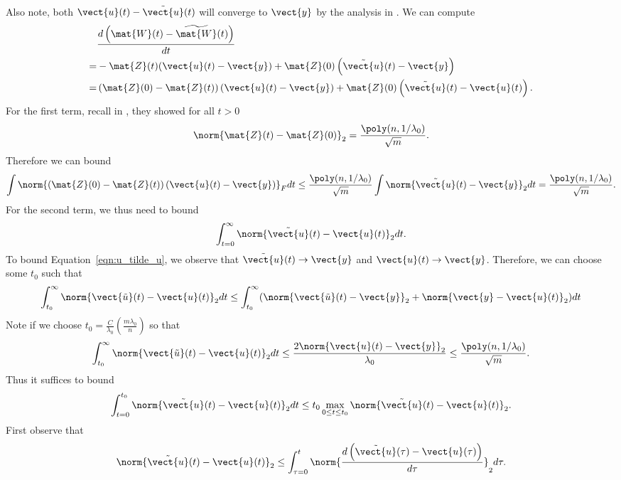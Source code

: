Also note, both $\vect{u}(t)-\tilde{\vect{u}}(t)$ will converge to $\vect{y}$ by the analysis in \cite{du2018provably}.
We can compute \begin{align*}
&\frac{d \left(\mat{W}(t)-\widetilde{\mat{W}}(t)\right)}{dt}\\
= &-\mat{Z}(t)(\vect{u}(t)-\vect{y}) + \mat{Z}(0)\left(\tilde{\vect{u}}(t)-\vect{y}\right) \\
= &\left(\mat{Z}(0)-\mat{Z}(t)\right)\left(\vect{u}(t)-\vect{y}\right) + \mat{Z}(0)\left(\tilde{\vect{u}}(t)-\vect{u}(t)\right).
\end{align*}
For the first term, recall in \cite{du2018provably}, they showed for all $t >0$ \begin{align*}
	\norm{\mat{Z}(t) - \mat{Z}(0)}_2 = \frac{\poly(n,1/\lambda_0)}{\sqrt{m}}.
\end{align*}
Therefore we can bound \begin{align*}
	\int \norm{\left(\mat{Z}(0)-\mat{Z}(t)\right)\left(\vect{u}(t)-\vect{y}\right) }_F dt \le \frac{\poly(n,1/\lambda_0)}{\sqrt{m}} \int \norm{\tilde{\vect{u}}(t)-\vect{y}}_2 dt= \frac{\poly(n,1/\lambda_0)}{\sqrt{m}}.
\end{align*}
For the second term, we thus need to bound\begin{align}
\int_{t=0}^{\infty}\norm{\tilde{\vect{u}}(t)-\vect{u}(t)}_2 dt. \label{eqn:u_tilde_u}
\end{align}
To bound Equation~\eqref{eqn:u_tilde_u}, we observe that $\tilde{\vect{u}}(t) \rightarrow \vect{y}$ and $\vect{u}(t) \rightarrow \vect{y}$.
Therefore, we can choose some $t_0$ such that \begin{align*}
\int_{t_0}^\infty\norm{\vect{\tilde{u}}(t)-\vect{u}(t)}_2 dt \le \int_{t_0}^\infty(\norm{\vect{\tilde{u}}(t)-\vect{y}}_2  + \norm{\vect{y}-\vect{u}(t)}_2 )dt
\end{align*}
Note if we choose $t_0 = \frac{C}{\lambda_0}\left(\frac{m\lambda_0}{n}\right)$ so that \begin{align*}
\int_{t_0}^\infty\norm{\vect{\tilde{u}}(t)-\vect{u}(t)}_2 dt \le \frac{2\norm{\vect{u}(t)-\vect{y}}_2}{\lambda_0} \le \frac{\poly(n,1/\lambda_0)}{\sqrt{m}}.
\end{align*}
Thus it suffices to bound \begin{align*}
	\int_{t=0}^{t_0}\norm{\tilde{\vect{u}}(t)-\vect{u}(t)}_2 dt \le t_0 \max_{0\le t\le t_0} \norm{\tilde{\vect{u}}(t)-\vect{u}(t)}_2.
\end{align*}
First observe that \[
 \norm{\tilde{\vect{u}}(t)-\vect{u}(t)}_2 \le \int_{\tau = 0}^t \norm{\frac{d\left(\tilde{\vect{u}}(\tau)-\vect{u}(\tau)\right)}{d \tau}}_2 d\tau.
 \]
